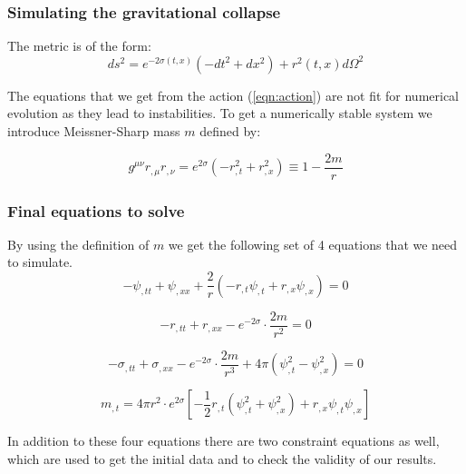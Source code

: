 \documentclass[hyperref={bookmarks=false},aspectratio=169]{beamer}
\begin{document}





\begin{frame}
    \frametitle{Simulating the gravitational collapse}

    The metric is of the form:
    \begin{equation*}
        ds^2=e^{-2 \sigma(t, x)}\left(-d t^{2}+d x^{2}\right)+r^{2}(t, x) d \Omega^{2}
    \end{equation*}

    The equations that we get from the action (\ref{eqn:action}) are not fit for numerical evolution as they lead to instabilities. To get a numerically stable system we introduce Meissner-Sharp mass $m$ defined by:

    \begin{equation}
        g^{\mu \nu} r_{, \mu} r_{, \nu}=e^{2 \sigma}\left(-r_{, t}^{2}+r_{, x}^{2}\right) \equiv 1-\frac{2 m}{r}
        \label{eqn:m_def}
    \end{equation}

\end{frame}


\begin{frame}
    \frametitle{Final equations to solve}

    By using the definition of $m$ we get the following set of 4 equations that we need to simulate.
    \begin{equation}
        -\psi_{, t t}+\psi_{, x x}+\frac{2}{r}\left(-r_{, t} \psi_{, t}+r_{, x} \psi_{, x}\right)=0
        \label{eqn:psi}
    \end{equation}

    \begin{equation}
        -r_{, t t}+r_{, x x}-e^{-2 \sigma} \cdot \frac{2 m}{r^{2}}=0
        \label{eqn:r}
    \end{equation}

    \begin{equation}
        -\sigma_{, t t}+\sigma_{, x x}-e^{-2 \sigma} \cdot \frac{2 m}{r^{3}}+4 \pi\left(\psi_{, t}^{2}-\psi_{, x}^{2}\right)=0
        \label{eqn:sigma}
    \end{equation}

    \begin{equation}
        m_{, t}=4 \pi r^{2} \cdot e^{2 \sigma}\left[-\frac{1}{2} r_{, t}\left(\psi_{, t}^{2}+\psi_{, x}^{2}\right)+r_{, x} \psi_{, t} \psi_{, x}\right]
        \label{eqn:m_t}
    \end{equation}

    In addition to these four equations there are two constraint equations as well, which are used to get the initial data and to check the validity of our results.


\end{frame}
\end{document}
